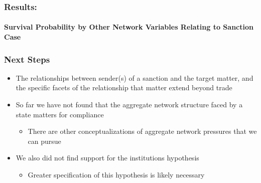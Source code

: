 \begin{frame}
\frametitle{Results:}	
\framesubtitle{Survival Probability by Other Network Variables Relating to Sanction Case}


\end{frame}

\begin{frame}
\frametitle{Next Steps}

\begin{itemize}
	\item The relationships between sender(s) of a sanction and the target matter, and the specific facets of the relationship that matter extend beyond trade
	\item So far we have not found that the aggregate network structure faced by a state matters for compliance
	\begin{itemize}
		\item There are other conceptualizations of aggregate network pressures that we can pursue
	\end{itemize}
	\item We also did not find support for the institutions hypothesis
	\begin{itemize}
		\item Greater specification of this hypothesis is likely necessary
	\end{itemize}
\end{itemize}
\end{frame}
